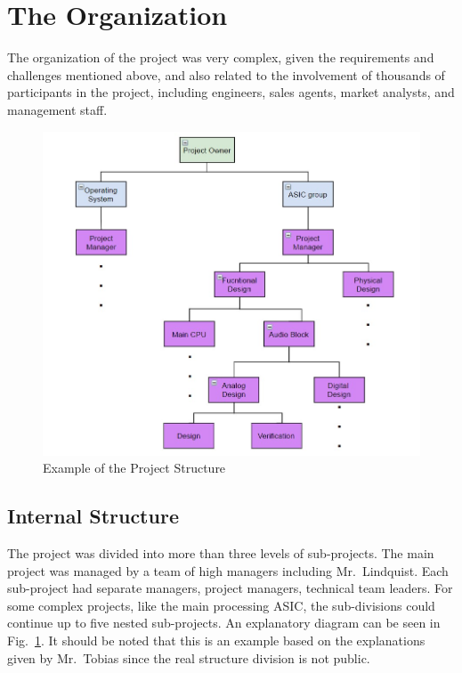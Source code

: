 \documentclass[conference]{IEEEtran}
\begin{document}
\section{The Organization}
The organization of the project was very complex, given the requirements and challenges mentioned above, and also related to the involvement of thousands of participants in the project, including engineers, sales agents, market analysts, and management staff. 

\begin{figure}[h]
    \centering
    \includegraphics[width=\linewidth]{project_structure.jpg}
    \caption{Example of the Project Structure}
    \label{fig:project_structure}
\end{figure}

\subsection{Internal Structure}
The project was divided into more than three levels of sub-projects. The main project was managed by a team of high managers including Mr.~Lindquist. Each sub-project had separate managers, project managers, technical team leaders. For some complex projects, like the main processing ASIC, the sub-divisions could continue up to five nested sub-projects. An explanatory diagram can be seen in Fig.~\ref{fig:project_structure}. It should be noted that this is an example based on the explanations given by Mr.~Tobias since the real structure division is not public.
\end{document}
